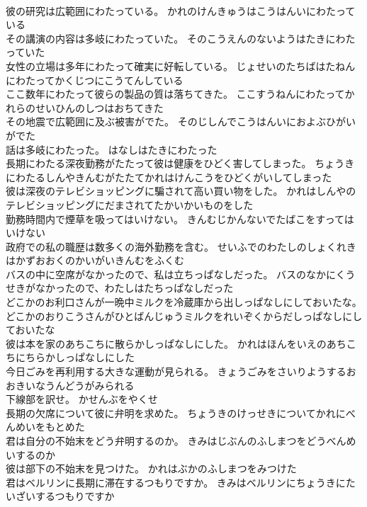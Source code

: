 \documentclass[8pt]{extreport}
\begin{document}
\begin{CJK}{UTF8}{min}
\\	彼の研究は広範囲にわたっている。	かれのけんきゅうはこうはんいにわたっている 
\\	その講演の内容は多岐にわたっていた。	そのこうえんのないようはたきにわたっていた 
\\	女性の立場は多年にわたって確実に好転している。	じょせいのたちばはたねんにわたってかくじつにこうてんしている 
\\	ここ数年にわたって彼らの製品の質は落ちてきた。	ここすうねんにわたってかれらのせいひんのしつはおちてきた 
\\	その地震で広範囲に及ぶ被害がでた。	そのじしんでこうはんいにおよぶひがいがでた 
\\	話は多岐にわたった。	はなしはたきにわたった 
\\	長期にわたる深夜勤務がたたって彼は健康をひどく害してしまった。	ちょうきにわたるしんやきんむがたたてかれはけんこうをひどくがいしてしまった 
\\	彼は深夜のテレビショッピングに騙されて高い買い物をした。	かれはしんやのテレビショッピングにだまされてたかいかいものをした 
\\	勤務時間内で煙草を吸ってはいけない。	きんむじかんないでたばこをすってはいけない 
\\	政府での私の職歴は数多くの海外勤務を含む。	せいふでのわたしのしょくれきはかずおおくのかいがいきんむをふくむ 
\\	バスの中に空席がなかったので、私は立ちっぱなしだった。	バスのなかにくうせきがなかったので、わたしはたちっぱなしだった 
\\	どこかのお利口さんが一晩中ミルクを冷蔵庫から出しっぱなしにしておいたな。	どこかのおりこうさんがひとばんじゅうミルクをれいぞくからだしっぱなしにしておいたな 
\\	彼は本を家のあちこちに散らかしっぱなしにした。	かれはほんをいえのあちこちにちらかしっぱなしにした 
\\	今日ごみを再利用する大きな運動が見られる。	きょうごみをさいりようするおおきいなうんどうがみられる 
\\	下線部を訳せ。	かせんぶをやくせ 
\\	長期の欠席について彼に弁明を求めた。	ちょうきのけっせきについてかれにべんめいをもとめた 
\\	君は自分の不始末をどう弁明するのか。	きみはじぶんのふしまつをどうべんめいするのか 
\\	彼は部下の不始末を見つけた。	かれはぶかのふしまつをみつけた 
\\	君はベルリンに長期に滞在するつもりですか。	きみはベルリンにちょうきにたいざいするつもりですか 

\end{CJK}
\end{document}
